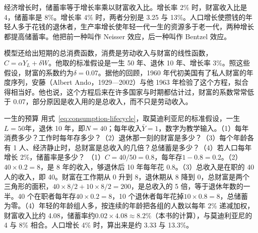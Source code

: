 经济增长时，储蓄率等于增长率乘以财富收入比\cite{modigliani1985}。增长率 2\% 时，财富收入比是 4，储蓄率是 8\%\cite{modigliani1985}。增长率 4\% 时，两者分别是 3.25 与 13\%\cite{modigliani1985}。人口增长使攒钱的年轻人多于花钱的退休者，生产率增长使年轻一代一生的资源多于老一代，两种增长都提高储蓄率\cite{modigliani1985}。他把前一种叫作 Neisser 效应，后一种叫作 Bentzel 效应\cite{modigliani1985}。

模型还给出短期的总消费函数，消费是劳动收入与财富的线性函数，$C=\alpha Y_L+\delta W$\cite{modigliani1985}。他取的标准假设是一生 50 年、退休 10 年、增长率 3\%\cite{modigliani1985}。照这些假设，财富的系数约为$\delta=0.07$\cite{modigliani1985}。据他的回顾，1960 年代初美国有了私人财富的年度序列，安藤（Albert Ando，1929—2002）与他 1963 年检验了这个方程，拟合得相当好\cite{modigliani1985,loc39,gnd39}。他也说，这个方程后来在许多国家与时期都估计过，财富的系数常常低于 0.07，部分原因是收入用的是总收入，而不只是劳动收入\cite{modigliani1985}。

\begin{example}{一生的预算}\label{ex:consumption-lifecycle}
用式~\eqref{eq:consumption-lifecycle}，取莫迪利亚尼的标准假设，一生$L=50$年，退休 10 年，即$N=40$；每年收入$\bar Y=1$，数字为教学输入。（1）每年消费多少？工作时每年存多少？（2）退休那一刻的财富是多少？（3）每个年龄各有 1 人、经济静止时，总财富是总收入的几倍？总储蓄是多少？（4）若人口每年增长 2\%，储蓄率是多少？
\solution
（1）$C=40/50=0.8$，每年存$1-0.8=0.2$。（2）$40\times0.2=8$，是 8 年的收入，够退休后 10 年每年花 0.8。（3）总收入是在职的 40 人的收入，即 40。财富在工作期从 0 升到 8，退休期从 8 降到 0，总财富是两个三角形的面积，$40\times8/2+10\times8/2=200$，是总收入的 5 倍，等于退休年数的一半。40 个在职者每年存$40\times0.2=8$，10 个退休者每年花掉$10\times0.8=8$，总储蓄为零。（4）年轻的年龄组人多，按连续的年龄把各组的人数以每年 2\% 递减加权，财富收入比约 4.08，储蓄率约$0.02\times4.08\approx8.2\%$（本书的计算），与莫迪利亚尼的 4 与 8\% 相合\cite{modigliani1985}。人口增长 4\% 时，算出来是约 3.33 与 13.3\%。
\end{example}


